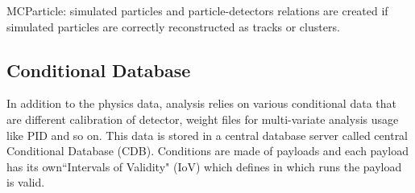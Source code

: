 \begin{comment}
\textbullet \space ECLCluster: reconstructed cluster in ECL detector. It consists of energy deposition and hit positions as well as other hit shape related variables. If a cluster is matched with an extrapolated track, a relation between them will also be created. 

\textbullet \space Reconstructed cluster KLM detector. It consists of momentum and position measurement. If a cluster is matched with an extrapolated track, a relation between them will also be created. 

\textbullet \space KLId: $K_L^0$ candidates with the particle identification as related to KLM and ECL clusters. 

\textbullet \space TRGSummary: L1 trigger information. 

\textbullet \space SoftwareTriggerResult: HLT information mapped by trigger names to trigger results. 
\end{comment}

\textbullet \space  MCParticle: simulated particles and particle-detectors relations are
created if simulated particles are correctly reconstructed as
tracks or clusters.
 

\subsection{Conditional Database}

In addition to the physics data, analysis relies on various conditional data that are different calibration of detector, weight files for multi-variate analysis usage like PID and so on. This data is stored in a central database server called central Conditional Database (CDB)\cite{BASF2}. 
Conditions are made of payloads and each payload has its own``Intervals of Validity" (IoV) which defines in which runs the payload is valid. 
\begin{comment}
A set of payloads and IoVs are called a global tag (GT). Considered the GT that is required by the different analysis purposes may change even though the experiment condition is still same, GT is subjected to be updated once new calibrations of detectors or weight files for analysis tools are available.
\end{comment}


